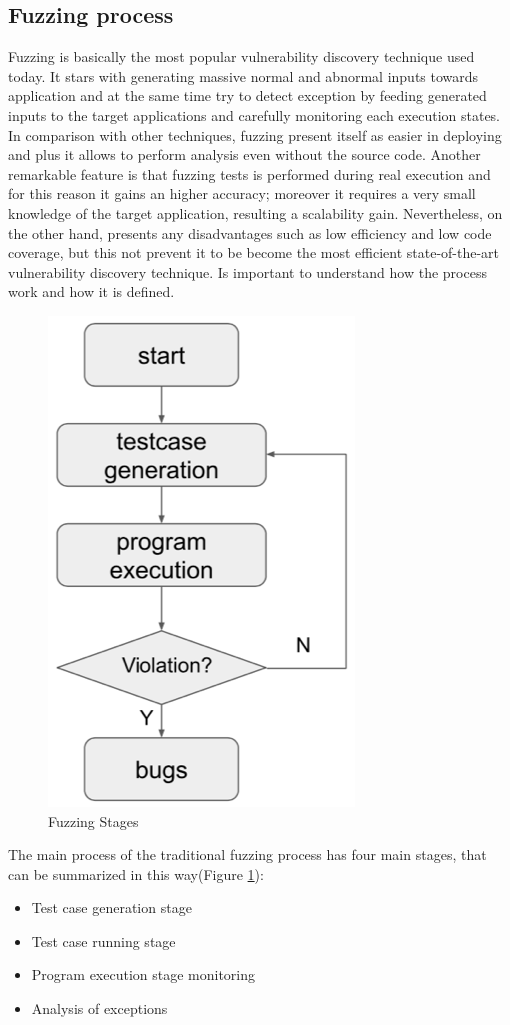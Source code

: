 \subsection{Fuzzing process}

Fuzzing is basically the most popular vulnerability discovery technique used today.
It stars with generating massive normal and abnormal inputs towards application and at the same time try to detect exception by feeding generated inputs to the target applications and carefully monitoring each execution states.
In comparison with other techniques, fuzzing present itself as easier in deploying and plus it allows to perform analysis even without the source code. Another remarkable feature is that fuzzing tests is performed during real execution
and for this reason it gains an higher accuracy; moreover it requires a very small knowledge of the target application, resulting a scalability gain. 
Nevertheless, on the other hand, presents any disadvantages such as low efficiency and low code coverage, but this not prevent it to be become the most efficient state-of-the-art
vulnerability discovery technique. Is important to understand how the process work and how it is defined.

\begin{figure}[tbh]
  \centering
  \includegraphics[width=0.5\linewidth]{images/fuzz_stages.png}
  \caption[Fuzzing Stages]{Fuzzing Stages}
  \label{fig:fuzz_stages}
\end{figure}


The main process of the traditional fuzzing process has four main stages, that can be summarized in this way(Figure \ref{fig:fuzz_stages}):
\begin{itemize}
  \item Test case generation stage
  \item Test case running stage
  \item Program execution stage monitoring
  \item Analysis of exceptions
  \end{itemize}


